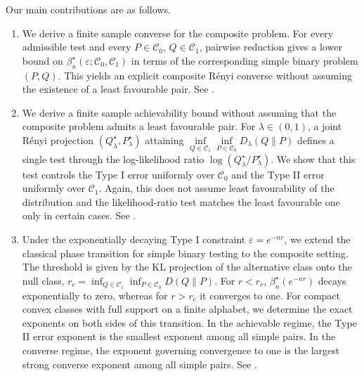 \documentclass[journal,10pt,draftclsnofoot,onecolumn]{IEEEtran}
\begin{document}
Our main contributions are as follows.
\begin{enumerate}

    \item We derive a finite sample converse for the composite problem. For every admissible test and every
    $P\in\mathcal C_0$, $Q\in\mathcal C_1$, pairwise reduction gives a lower bound on $\beta_n^\star(\varepsilon;\mathcal C_0,\mathcal C_1)$
    in terms of the corresponding simple binary problem $(P,Q)$. This yields an explicit composite R\'enyi converse without assuming the existence of a least favourable pair. See .

    \item We derive a finite sample achievability bound without assuming that the composite problem admits a least favourable pair. For $\lambda\in(0,1)$, a joint R\'enyi projection $(Q_\lambda^\star,P_\lambda^\star)$ attaining $\inf\limits_{Q\in\mathcal C_1} \inf\limits_{P\in\mathcal C_0}D_\lambda(Q\|P)$ defines a single test through the log-likelihood ratio $\log(Q_\lambda^\star/P_\lambda^\star)$. We show that this test controls the Type I error uniformly over $\mathcal C_0$ and the Type II error uniformly over $\mathcal C_1$. Again, this does not assume least favourability of the distribution and the likelihood-ratio test matches the least favourable one only in certain cases. See .  

    \item Under the exponentially decaying Type I constraint $\varepsilon=e^{-nr}$, we extend the classical phase transition for simple binary testing to the composite setting. The threshold is given by the KL projection of the alternative class onto the null class, $r_c=\inf_{Q\in\mathcal C_1}\inf_{P\in\mathcal C_0}D(Q\|P)$. For $r<r_c$, $\beta_n^\star(e^{-nr})$ decays exponentially to zero, whereas for $r>r_c$ it converges to one. For compact convex classes with full support on a finite alphabet, we determine the exact exponents on both sides of this transition. In the achievable regime, the Type II error exponent is the smallest exponent among all simple pairs. In the converse regime, the exponent governing convergence to one is the largest strong converse exponent among all simple pairs. See .


\end{enumerate}
\end{document}
